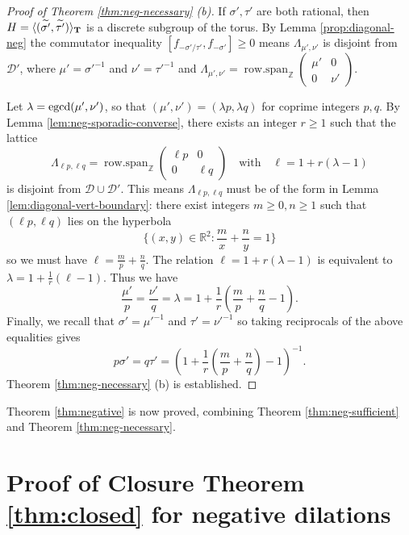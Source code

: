 \documentclass[11pt, letterpaper, reqno]{amsart}
\theoremstyle{definition}
\theoremstyle{remark}
\numberwithin{equation}{section}
\newcommand{\RR}{\ensuremath{\mathbb{R}}}
\newcommand{\ZZ}{\ensuremath{\mathbb{Z}}}
\newcommand{\bT}{{\bf T}}
\newcommand{\uu}{{\mu'}}
\newcommand{\vv}{{\nu'}}
\newcommand{\cD}{\mathcal{D}}
\newcommand{\cDprime}{{\mathcal{D}'}}
\newcommand{\egcd}{{\rm egcd}}
\newcommand{\tbetap}{{\sigma'}}
\newcommand{\trhop}{{\tau'}}
\DeclareMathOperator{\rowspan}{row.span}
\begin{document}
\begin{proof}[Proof of Theorem \ref{thm:neg-necessary} (b)]
If $\tbetap,\trhop$ are both rational, then 
$H = \langle (\widetilde{\tbetap},\widetilde{\trhop})\rangle_{\bT}$ 
is a discrete subgroup of the torus.
By Lemma \ref{prop:diagonal-neg} the commutator inequality 
$[f_{-\tbetap/\trhop},f_{-\tbetap}]\geq 0$ means $\Lambda_{\uu,\vv}$ 
is 
disjoint from $\cDprime$, 
where $\uu = \tbetap^{-1}$ and $\vv = \trhop^{-1}$ and
$ \Lambda_{\uu,\vv} = \rowspan_\ZZ\begin{pmatrix}
\uu & 0  \\
0 & \vv 
\end{pmatrix}$.

Let $\lambda = \egcd(\uu,\vv)$, so that $(\uu, \vv) = (\lambda p, \lambda q)$ for coprime integers $p,q$.
By  
Lemma \ref{lem:neg-sporadic-converse}, there exists an integer $r\geq 1$ such that
the lattice
\[ \Lambda_{\ell p,\ell q} = \rowspan_\ZZ\begin{pmatrix}
\ell p & 0  \\
0 & \ell q 
\end{pmatrix}
\quad\text{with}\quad
 \ell =  1 + r(\lambda -1) \]
is disjoint from $\cD\cup\cDprime$.
This means $\Lambda_{\ell p,\ell q}$  must be of the form in Lemma \ref{lem:diagonal-vert-boundary}:
there exist integers $m\geq 0, n\geq 1$ such that $(\ell p, \ell q)$ lies on the hyperbola
\[ 
\{ (x,y) \in \RR^2 : \frac{m}{x} + \frac{n}{y} = 1 \}
\]
so we must have
$ \ell = \frac{m}{p}+\frac{n}{q} $.
The relation $\ell  = 1 + r(\lambda - 1)$
is equivalent to $\lambda = 1 + \frac{1}{r}(\ell - 1)$.
Thus we have
\[ 
\frac{\uu}{p} = \frac{\vv}{q} = \lambda 
= 1  + \frac1{r}\left(\frac{m}{p}+\frac{n}{q} - 1\right).
\]
Finally,  we recall that $\tbetap = \uu^{-1}$ and $\trhop = \vv^{-1}$
so taking reciprocals of the above equalities gives
\[ p\tbetap = q\trhop = \left( 1 + \frac1{r} \left(\frac{m}{p}+\frac{n}{q}\right) - 1 \right)^{-1} .\]
 Theorem \ref{thm:neg-necessary} (b)  is established.
\end{proof}

Theorem \ref{thm:negative} is now proved,  combining
Theorem \ref{thm:neg-sufficient} and Theorem \ref{thm:neg-necessary}.

%
%
\section{Proof of Closure Theorem \ref{thm:closed} for negative dilations}
\label{sec:consequences}
\end{document}
